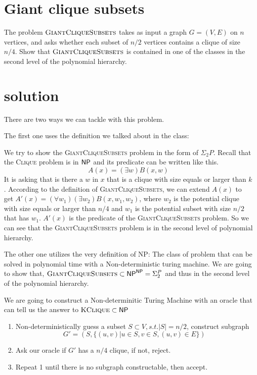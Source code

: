 

\maketitle
\thispagestyle{firststyle}
\vspace{-2.0cm}

\section{Giant clique subsets}
    The problem $\textsc{GiantCliqueSubsets}$ takes as input a graph $G = (V,E)$ on $n$ vertices, and asks whether each subset of $n/2$ vertices contains a clique of size $n/4$. Show that $\textsc{GiantCliqueSubsets}$ is contained in one of the classes in the second level of the polynomial hierarchy.
 
\section*{solution}
There are two ways we can tackle with this problem. 

The first one uses the definition we talked about in the class:

We try to show the \textsc{GiantCliqueSubsets} problem in the form of $\Sigma_2P$. 
Recall that the \textsc{Clique} problem is in $\mathsf{NP}$ and its predicate can be written like this.
$$A(x) = (\exists w)B(x, w)$$
It is asking that is there a $w$ in $x$ that is a clique with size equals or larger than $k$. 
According to the definition of \textsc{GiantCliqueSubsets}, we can extend $A(x)$ to get $A'(x) = (\forall w_1)(\exists w_2)B(x, w_1, w_2)$, 
where $w_2$ is the potential clique with size equals or larger than $n/4$ and $w_1$ is the potential 
subset with size $n/2$ that has $w_1$. $A'(x)$ is the predicate of the \textsc{GiantCliqueSubsets} problem. 
So we can see that the \textsc{GiantCliqueSubsets} problem is in the second level of polynomial hierarchy.


The other one utilizes the very definition of NP: The class of problem that can be solved in polynomial time with a Non-deterministic turing machine.
We are going to show that, $\textsc{GiantCliqueSubsets} \subset \mathsf{NP}^{\mathsf{NP}} = \Sigma_2^P$ and thus in the second level of the polynomial hierarchy.

We are going to construct a Non-determinitic Turing Machine with an oracle that can tell us the answer to $\textsc{KClique} \subset \mathsf{NP}$

\begin{enumerate}
    \item Non-deterministically guess a subset $S \subset V, s.t. |S| = n/2$, 
    construct subgraph $$G' = (S, \{(u, v) | u \in S, v \in S, (u, v) \in E\})$$
    \item Ask our oracle if $G'$ has a $n/4$ clique, if not, reject.
    \item Repeat 1 until there is no subgraph constructable, then accept.
\end{enumerate}



